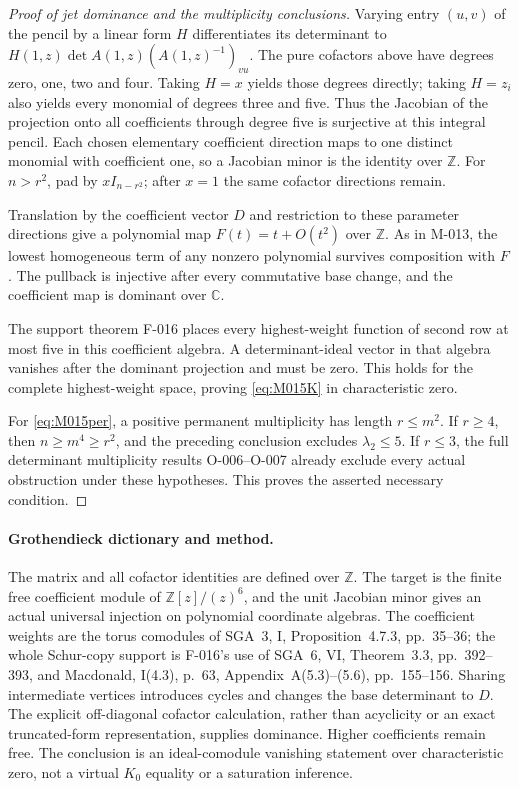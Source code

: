 \begin{proof}[Proof of jet dominance and the multiplicity conclusions]
Varying entry \((u,v)\) of the pencil by a linear form
\(H\) differentiates its determinant to
\(H(1,z)\det A(1,z)(A(1,z)^{-1})_{vu}\).
The pure cofactors above have degrees zero, one, two and
four. Taking \(H=x\) yields those degrees directly;
taking \(H=z_i\) also yields every monomial of degrees
three and five. Thus the Jacobian of the projection onto
all coefficients through degree five is surjective at this
integral pencil. Each chosen elementary coefficient direction
maps to one distinct monomial with coefficient one, so a
Jacobian minor is the identity over \(\mathbb Z\).
For \(n>r^2\), pad by \(xI_{n-r^2}\); after \(x=1\)
the same cofactor directions remain.

Translation by the coefficient vector \(D\) and restriction
to these parameter directions give a polynomial map
\(F(t)=t+O(t^2)\) over \(\mathbb Z\). As in M-013,
the lowest homogeneous term of any nonzero polynomial
survives composition with \(F\). The pullback is injective
after every commutative base change, and the coefficient
map is dominant over \(\mathbb C\).

The support theorem F-016 places every highest-weight
function of second row at most five in this coefficient
algebra. A determinant-ideal vector in that algebra vanishes
after the dominant projection and must be zero. This holds
for the complete highest-weight space, proving
\eqref{eq:M015K} in characteristic zero.

For \eqref{eq:M015per}, a positive permanent multiplicity
has length \(r\leq m^2\). If \(r\geq4\), then
\(n\geq m^4\geq r^2\), and the preceding conclusion
excludes \(\lambda_2\leq5\). If \(r\leq3\), the
full determinant multiplicity results O-006--O-007 already
exclude every actual obstruction under these hypotheses.
This proves the asserted necessary condition.
\end{proof}

\paragraph{Grothendieck dictionary and method.}
The matrix and all cofactor identities are defined over
\(\mathbb Z\). The target is the finite free coefficient
module of \(\mathbb Z[z]/(z)^6\), and the unit Jacobian
minor gives an actual universal injection on polynomial
coordinate algebras. The coefficient weights are the torus
comodules of SGA~3, I, Proposition~4.7.3, pp.~35--36;
the whole Schur-copy support is F-016's use of SGA~6, VI,
Theorem~3.3, pp.~392--393, and Macdonald, I(4.3), p.~63,
Appendix~A(5.3)--(5.6), pp.~155--156.
Sharing intermediate vertices introduces cycles and changes
the base determinant to \(D\). The explicit off-diagonal
cofactor calculation, rather than acyclicity or an exact
truncated-form representation, supplies dominance. Higher
coefficients remain free. The conclusion is an ideal-comodule
vanishing statement over characteristic zero, not a virtual
\(K_0\) equality or a saturation inference.
